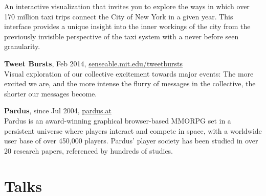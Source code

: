 \documentclass[10pt,a4paper]{article}
\renewenvironment{itemize}{
  \begin{list}{}{
    \setlength{\leftmargin}{1.5em}
    \setlength{\itemsep}{0.25em}
    \setlength{\parskip}{0pt}
    \setlength{\parsep}{0.25em}
  }
}{
  \end{list}
}
\begin{document}
\begin{itemize}
{An interactive visualization that invites you to explore the ways in which over 170 million taxi trips connect the City of New York in a given year. This interface provides a unique insight into the inner workings of the city from the previously invisible perspective of the taxi system with a never before seen granularity.}\\
\item{\textbf{Tweet Bursts}, Feb 2014, \href{http://senseable.mit.edu/tweetbursts}{senseable.mit.edu/tweetbursts}\\[2pt]
Visual exploration of our collective excitement towards major events: The more excited we are, and the more intense the flurry of messages in the collective, the shorter our messages become.}\\
\item{\textbf{Pardus}, since Jul 2004}, \href{https://pardus.at}{pardus.at}\\[2pt]
Pardus is an award-winning graphical browser-based MMORPG set in a persistent universe where players interact and compete in space, with a worldwide user base of over 450,000 players. Pardus' player society has been studied in over 20 research papers, referenced by hundreds of studies.
\end{itemize}

\section*{Talks}
\end{document}
